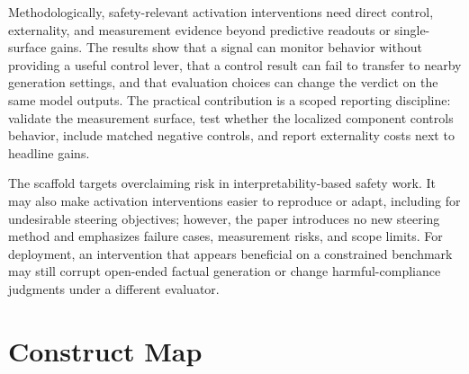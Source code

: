 \documentclass{article}
\begin{document}
Methodologically, safety-relevant activation interventions need direct control, externality, and measurement evidence beyond predictive readouts or single-surface gains.
The results show that a signal can monitor behavior without providing a useful control lever, that a control result can fail to transfer to nearby generation settings, and that evaluation choices can change the verdict on the same model outputs.
The practical contribution is a scoped reporting discipline: validate the measurement surface, test whether the localized component controls behavior, include matched negative controls, and report externality costs next to headline gains.

The scaffold targets overclaiming risk in interpretability-based safety work.
It may also make activation interventions easier to reproduce or adapt, including for undesirable steering objectives; however, the paper introduces no new steering method and emphasizes failure cases, measurement risks, and scope limits.
For deployment, an intervention that appears beneficial on a constrained benchmark may still corrupt open-ended factual generation or change harmful-compliance judgments under a different evaluator.




\clearpage
\onecolumn
\appendix

\section{Construct Map}
\label{app:constructs}
\end{document}
